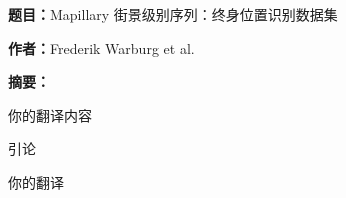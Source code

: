 
{\noindent\textbf{题目：}Mapillary 街景级别序列：终身位置识别数据集

\noindent \textbf{作者：}Frederik Warburg et al.

\noindent\textbf{摘要：}}你的翻译内容

\begin{center}
    引论
\end{center}

你的翻译